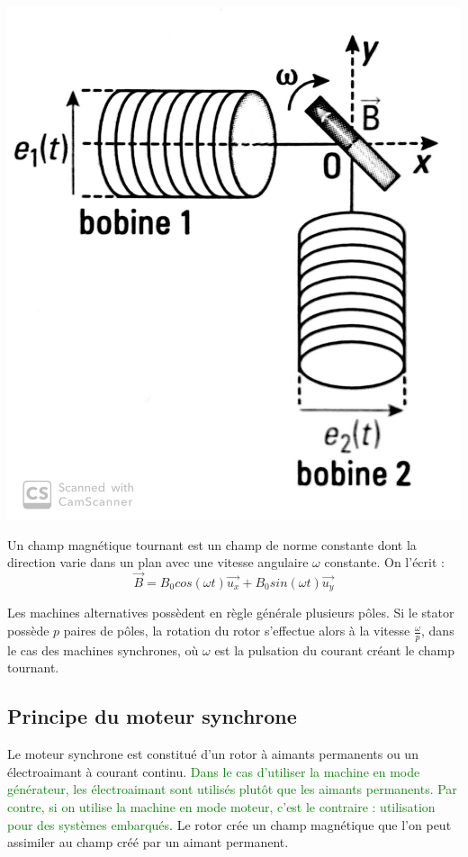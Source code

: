 \documentclass{article}
\begin{document}
\begin{center}
    \includegraphics[scale=0.14]{bobinesdiphasees.jpg}
\end{center}

Un champ magnétique tournant est un champ de norme constante dont la direction varie dans un plan avec une vitesse angulaire $\omega$ constante. On l'écrit : 
\begin{equation}
    \vec{B} = B_0 cos(\omega t)\vec{u_x} + B_0 sin(\omega t)\vec{u_y}
\end{equation}

Les machines alternatives possèdent en règle générale plusieurs pôles. Si le stator possède $p$ paires de pôles, la rotation du rotor s'effectue alors à la vitesse $\frac{\omega}{p}$, dans le cas des machines synchrones, où $\omega$ est la pulsation du courant créant le champ tournant.

\subsection{Principe du moteur synchrone}

Le moteur synchrone est constitué d'un rotor à aimants permanents ou un électroaimant à courant continu. \textcolor{green}{Dans le cas d'utiliser la machine en mode générateur, les électroaimant sont utilisés plutôt que les aimants permanents. Par contre, si on utilise la machine en mode moteur, c'est le contraire : utilisation pour des systèmes embarqués}. Le rotor crée un champ magnétique que l'on peut assimiler au champ créé par un aimant permanent.\medskip
\end{document}
